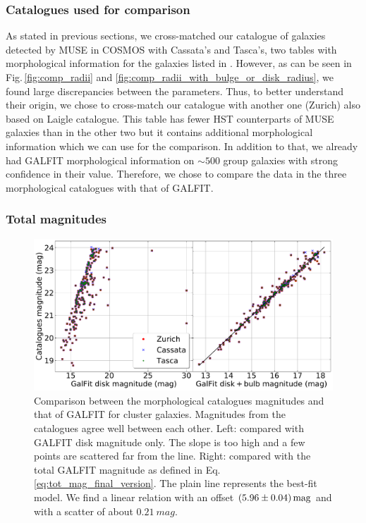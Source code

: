 \subsubsection{Catalogues used for comparison}

As stated in previous sections, we cross-matched our catalogue of galaxies detected by MUSE in COSMOS with Cassata's and Tasca's, two tables with morphological information for the galaxies listed in . However, as can be seen in Fig.\,\ref{fig:comp_radii} and \ref{fig:comp_radii_with_bulge_or_disk_radius}, we found large discrepancies between the parameters. Thus, to better understand their origin, we chose to cross-match our catalogue with another one (Zurich) also based on Laigle catalogue. This table has fewer HST counterparts of MUSE galaxies than in the other two but it contains additional morphological information which we can use for the comparison. In addition to that, we already had GALFIT morphological information on $\sim 500$ group galaxies with strong confidence in their value. Therefore, we chose to compare the data in the three morphological catalogues with that of GALFIT.

\subsubsection{Total magnitudes}

\begin{figure}[htbp]
	\includegraphics[width=\linewidth]{../Plots/catalogMag_against_GalfitMag_corrected.pdf}
	\caption[Comparison between magnitudes]{Comparison between the morphological catalogues magnitudes and that of GALFIT for cluster galaxies. Magnitudes from the catalogues agree well between each other. Left: compared with GALFIT disk magnitude only. The slope is too high and a few points are scattered far from the line. Right: compared with the total GALFIT magnitude as defined in Eq.\,\ref{eq:tot_mag_final_version}. The plain line represents the best-fit model. We find a linear relation with an offset $(5.96 \pm 0.04)\, \rm{mag}$ and with a scatter of about $\SI{0.21}{mag}$.}
	\label{fig:comp_mags}
\end{figure}


